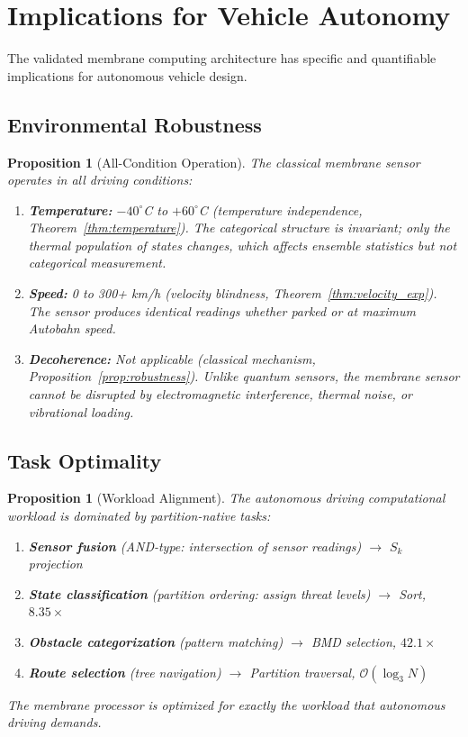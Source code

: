 \documentclass[12pt]{article}
\newtheorem{proposition}[theorem]{Proposition}
\theoremstyle{definition}
\theoremstyle{remark}
\newcommand{\Sk}{S_k}
\begin{document}
\section{Implications for Vehicle Autonomy}
\label{sec:vehicle}

The validated membrane computing architecture has specific and quantifiable implications for autonomous vehicle design.

\subsection{Environmental Robustness}

\begin{proposition}[All-Condition Operation]
\label{prop:all_condition}
The classical membrane sensor operates in all driving conditions:
\begin{enumerate}[label=(\roman*)]
    \item \textbf{Temperature:} $-40^\circ$C to $+60^\circ$C (temperature independence, Theorem~\ref{thm:temperature}). The categorical structure is invariant; only the thermal population of states changes, which affects ensemble statistics but not categorical measurement.
    \item \textbf{Speed:} 0 to 300+ km/h (velocity blindness, Theorem~\ref{thm:velocity_exp}). The sensor produces identical readings whether parked or at maximum Autobahn speed.
    \item \textbf{Decoherence:} Not applicable (classical mechanism, Proposition~\ref{prop:robustness}). Unlike quantum sensors, the membrane sensor cannot be disrupted by electromagnetic interference, thermal noise, or vibrational loading.
\end{enumerate}
\end{proposition}

\subsection{Task Optimality}

\begin{proposition}[Workload Alignment]
\label{prop:workload}
The autonomous driving computational workload is dominated by partition-native tasks:
\begin{enumerate}[label=(\roman*)]
    \item \textbf{Sensor fusion} (AND-type: intersection of sensor readings) $\to$ $\Sk$ projection
    \item \textbf{State classification} (partition ordering: assign threat levels) $\to$ Sort, $8.35\times$
    \item \textbf{Obstacle categorization} (pattern matching) $\to$ BMD selection, $42.1\times$
    \item \textbf{Route selection} (tree navigation) $\to$ Partition traversal, $\mathcal{O}(\log_3 N)$
\end{enumerate}
The membrane processor is optimized for exactly the workload that autonomous driving demands.
\end{proposition}
\end{document}
